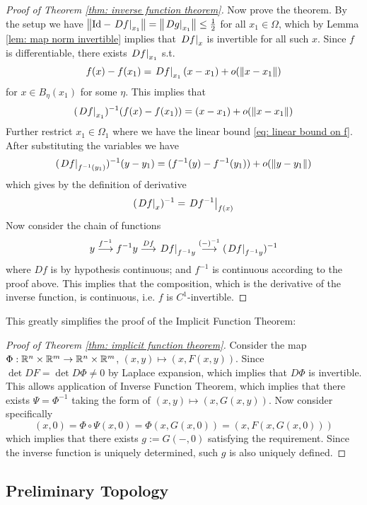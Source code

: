 \documentclass{article}
\begin{document}
\begin{proof}[Proof of Theorem \ref{thm: inverse function theorem}]
    Now prove the theorem. By the setup we have $\left\|\mathrm{Id} - \left.Df\right|_{x_1}\right\| = \left\|\left.Dg\right|_{x_1}\right\| \leq \frac{1}{2}$ for all $x_1 \in \Omega$, which by Lemma \ref{lem: map norm invertible} implies that $\left.Df\right|_{x}$ is invertible for all such $x$. Since $f$ is differentiable, there exists $\left.Df\right|_{x_1}$ s.t. 
    \[
        f(x) - f(x_1) = \left.Df\right|_{x_1} (x - x_1) + o(\left\|x - x_1\right\|)
    \]
    for $x \in B_{\eta}(x_1)$ for some $\eta$. This implies that
    \[
        (\left.Df\right|_{x_1})^{-1}(f(x) - f(x_1)) = (x - x_1) + o(\left\|x - x_1\right\|)
    \]
    Further restrict $x_1 \in \Omega_1$ where we have the linear bound \eqref{eq: linear bound on f}. After substituting the variables we have
    \[
        (\left.Df\right|_{f^{-1}(y_1)})^{-1}(y - y_1) = (f^{-1}(y) - f^{-1}(y_1)) + o(\left\|y - y_1\right\|)
    \]
    which gives by the definition of derivative
    \[
        (\left.Df\right|_{x})^{-1} = \left.Df^{-1}\right|_{f(x)} 
    \]
    Now consider the chain of functions
    \[
        y \overset{f^{-1}}{\longrightarrow} f^{-1}y \overset{Df}{\longrightarrow} \left.Df\right|_{f^{-1}y} \overset{(-)^{-1}}{\longrightarrow} (\left.Df\right|_{f^{-1}y})^{-1}
    \]
    where $Df$ is by hypothesis continuous; and $f^{-1}$ is continuous according to the proof above. This implies that the composition, which is the derivative of the inverse function, is continuous, i.e. $f$ is $C^1$-invertible.
\end{proof}

This greatly simplifies the proof of the Implicit Function Theorem:
\begin{proof}[Proof of Theorem \ref{thm: implicit function theorem}]
    Consider the map $\Phi: \mathbb{R}^n \times \mathbb{R}^m \to \mathbb{R}^n \times \mathbb{R}^m$, $(x, y) \mapsto (x, F(x, y))$. Since $\det DF = \det D\Phi \neq 0$ by Laplace expansion, which implies that $D\Phi$ is invertible. This allows application of Inverse Function Theorem, which implies that there exists $\Psi = \Phi^{-1}$ taking the form of $(x, y) \mapsto (x, G(x, y))$. Now consider specifically
    \[
        (x, 0) = \Phi \circ \Psi(x, 0) = \Phi(x, G(x, 0)) = (x, F(x, G(x, 0)))
    \]
    which implies that there exists $g := G(-, 0)$ satisfying the requirement. Since the inverse function is uniquely determined, such $g$ is also uniquely defined.
\end{proof}

\subsection{Preliminary Topology}
\end{document}
